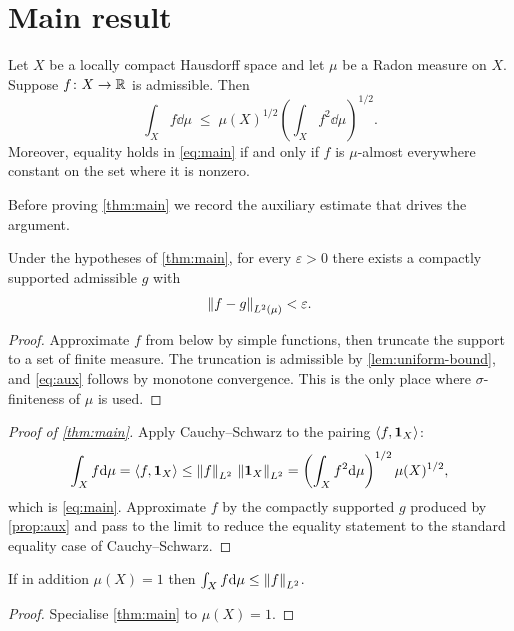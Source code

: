 
\section{Main result}
\label{sec:main-result}

\begin{theorem}
\label{thm:main}
Let $X$ be a locally compact Hausdorff space and let $\mu$ be a Radon
measure on $X$. Suppose $f \colon X \to \mathbb{R}$ is admissible. Then
\begin{equation}
\label{eq:main}
  \int_X f \dd\mu \;\le\; \mu(X)^{1/2}\left(\int_X f^2 \dd\mu\right)^{1/2}.
\end{equation}
Moreover, equality holds in \cref{eq:main} if and only if $f$ is
$\mu$-almost everywhere constant on the set where it is nonzero.
\end{theorem}

Before proving \cref{thm:main} we record the auxiliary estimate that
drives the argument.

\begin{proposition}
\label{prop:aux}
Under the hypotheses of \cref{thm:main}, for every $\varepsilon > 0$
there exists a compactly supported admissible $g$ with
\begin{equation}
\label{eq:aux}
  \left\lVert f - g \right\rVert_{L^2(\mu)} < \varepsilon .
\end{equation}
\end{proposition}

\begin{proof}
Approximate $f$ from below by simple functions, then truncate the
support to a set of finite measure. The truncation is admissible by
\cref{lem:uniform-bound}, and \cref{eq:aux} follows by monotone
convergence. This is the only place where $\sigma$-finiteness of
$\mu$ is used.
\end{proof}



\begin{proof}[Proof of \cref{thm:main}]
Apply Cauchy--Schwarz to the pairing $\left\langle f, \mathbf{1}_X \right\rangle$:
\[
  \int_X f \mathrm{d}\mu
  = \left\langle f, \mathbf{1}_X \right\rangle
  \le \left\lVert f \right\rVert_{L^2}\,\left\lVert \mathbf{1}_X \right\rVert_{L^2}
  = \left(\int_X f^2 \mathrm{d}\mu\right)^{1/2} \mu(X)^{1/2},
\]
which is \cref{eq:main}. Approximate $f$ by the compactly supported
$g$ produced by \cref{prop:aux} and pass to the limit to reduce the
equality statement to the standard equality case of Cauchy--Schwarz.
\end{proof}

\begin{corollary}
\label{cor:consequence}
If in addition $\mu(X) = 1$ then $\int_X f \mathrm{d}\mu \le \left\lVert f \right\rVert_{L^2}$.
\end{corollary}

\begin{proof}
Specialise \cref{thm:main} to $\mu(X) = 1$.
\end{proof}
